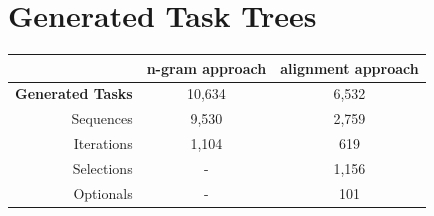 \section{Generated Task Trees}
\begin{table}
	\centering
 \begin{tabular}{|r|c|c|}
	   \hline
	      & \textbf{n-gram approach} & \textbf{alignment approach} \\
	     \hline
	       \textbf{Generated Tasks} & 10,634 & 6,532 \\
	       Sequences & 9,530 & 2,759 \\
	       Iterations & 1,104 & 619 \\
	       Selections & -& 1,156 \\
	       Optionals & -& 101 \\
	       \hline
\end{tabular}

\end{table}


